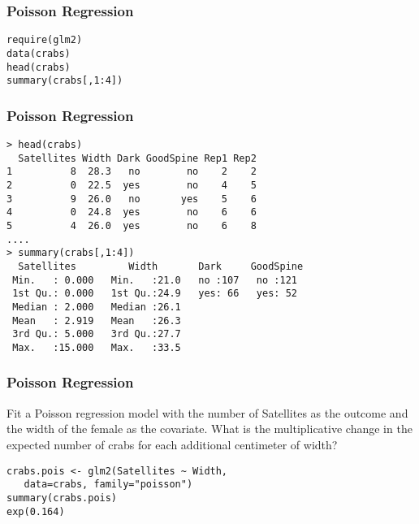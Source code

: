 \documentclass{beamer}
\begin{document}
\begin{frame}[fragile]
\frametitle{Poisson Regression}
\Large

\begin{framed}
\begin{verbatim}
require(glm2)
data(crabs)
head(crabs)
summary(crabs[,1:4])
\end{verbatim}
\end{framed}

\end{frame}

\begin{frame}[fragile]
\frametitle{Poisson Regression}
\Large

\begin{verbatim}
> head(crabs)
  Satellites Width Dark GoodSpine Rep1 Rep2
1          8  28.3   no        no    2    2
2          0  22.5  yes        no    4    5
3          9  26.0   no       yes    5    6
4          0  24.8  yes        no    6    6
5          4  26.0  yes        no    6    8
....
> summary(crabs[,1:4])
  Satellites         Width       Dark     GoodSpine
 Min.   : 0.000   Min.   :21.0   no :107   no :121  
 1st Qu.: 0.000   1st Qu.:24.9   yes: 66   yes: 52  
 Median : 2.000   Median :26.1                      
 Mean   : 2.919   Mean   :26.3                      
 3rd Qu.: 5.000   3rd Qu.:27.7                      
 Max.   :15.000   Max.   :33.5                

\end{verbatim}


\end{frame}

\begin{frame}[fragile]
\frametitle{Poisson Regression}
\Large

Fit a Poisson regression model with the number of Satellites as the outcome and the width of the female as the covariate. What is the multiplicative change in the expected number of crabs for each additional centimeter of width?
\begin{framed}
\begin{verbatim}
crabs.pois <- glm2(Satellites ~ Width, 
   data=crabs, family="poisson")
summary(crabs.pois)
exp(0.164)
\end{verbatim}
\end{framed}

\end{frame}
\end{document}
